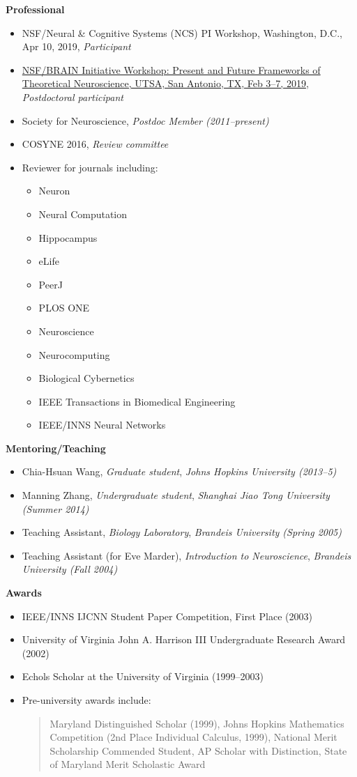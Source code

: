 \documentclass[10pt]{article}
\begin{document}
{\large \textbf{Professional}}
\begin{itemize}
  \item NSF/Neural \& Cognitive Systems (NCS) PI Workshop, Washington, D.C., Apr 10, 2019, \emph{Participant}
  \item \href{https://www.utsa.edu/SantamariaLab/Workshop/index.html}{NSF/BRAIN Initiative Workshop: Present and Future Frameworks of Theoretical Neuroscience, UTSA, San Antonio, TX, Feb 3--7, 2019}, \emph{Postdoctoral participant}
  \item Society for Neuroscience, \emph{Postdoc Member (2011--present)}
  \item COSYNE 2016, \emph{Review committee}
  \item Reviewer for journals including:
  \begin{itemize}
    \item Neuron
    \item Neural Computation
    \item Hippocampus
    \item eLife
    \item PeerJ
    \item PLOS ONE
    \item Neuroscience
    \item Neurocomputing
    \item Biological Cybernetics
    \item IEEE Transactions in Biomedical Engineering
    \item IEEE/INNS Neural Networks
  \end{itemize}
\end{itemize}

{\large \textbf{Mentoring/Teaching}}
\begin{itemize}
  \item Chia-Hsuan Wang, \emph{Graduate student}, \emph{Johns Hopkins University (2013--5)}
  \item Manning Zhang, \emph{Undergraduate student}, \emph{Shanghai Jiao Tong University (Summer 2014)}
  \item Teaching Assistant, \emph{Biology Laboratory}, \emph{Brandeis University (Spring 2005)}
  \item Teaching Assistant (for Eve Marder), \emph{Introduction to Neuroscience}, \emph{Brandeis University (Fall 2004)}
\end{itemize}

{\large \textbf{Awards}}
\begin{itemize}
  \item IEEE/INNS IJCNN Student Paper Competition, First Place (2003)
  \item University of Virginia John A. Harrison III Undergraduate Research Award (2002)
  \item Echols Scholar at the University of Virginia (1999--2003)
  \item Pre-university awards include:
\begin{quote}
Maryland Distinguished Scholar (1999), Johns Hopkins Mathematics Competition (2nd Place Individual Calculus, 1999), National Merit Scholarship Commended Student, AP Scholar with Distinction, State of Maryland Merit Scholastic Award
\end{quote}
\end{itemize}
\end{document}
